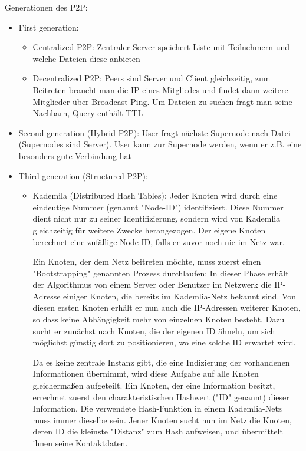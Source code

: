 \documentclass{article}
\begin{document}
	Generationen des P2P:
	\begin{itemize}
		\item First generation:
		\begin{itemize}
			\item Centralized P2P: Zentraler Server speichert Liste mit Teilnehmern und welche Dateien diese anbieten
			\item Decentralized P2P: Peers sind Server und Client gleichzeitig, zum Beitreten braucht man die IP eines Mitgliedes und findet dann weitere Mitglieder über Broadcast Ping. Um Dateien zu suchen fragt man seine Nachbarn, Query enthält TTL
		\end{itemize}
		\item Second generation (Hybrid P2P): User fragt nächste Supernode nach Datei (Supernodes sind Server). User kann zur Supernode werden, wenn er z.B. eine besonders gute Verbindung hat
		\item Third generation (Structured P2P):
		\begin{itemize}
			\item Kademila (Distributed Hash Tables): Jeder Knoten wird durch eine eindeutige Nummer (genannt "Node-ID") identifiziert. Diese Nummer dient nicht nur zu seiner Identifizierung, sondern wird von Kademlia gleichzeitig für weitere Zwecke herangezogen. Der eigene Knoten berechnet eine zufällige Node-ID, falls er zuvor noch nie im Netz war.
			
			Ein Knoten, der dem Netz beitreten möchte, muss zuerst einen "Bootstrapping" genannten Prozess durchlaufen: In dieser Phase erhält der Algorithmus von einem Server oder Benutzer im Netzwerk die IP-Adresse einiger Knoten, die bereits im Kademlia-Netz bekannt sind. Von diesen ersten Knoten erhält er nun auch die IP-Adressen weiterer Knoten, so dass keine Abhängigkeit mehr von einzelnen Knoten besteht. Dazu sucht er zunächst nach Knoten, die der eigenen ID ähneln, um sich möglichst günstig dort zu positionieren, wo eine solche ID erwartet wird.
			
			Da es keine zentrale Instanz gibt, die eine Indizierung der vorhandenen Informationen übernimmt, wird diese Aufgabe auf alle Knoten gleichermaßen aufgeteilt. Ein Knoten, der eine Information besitzt, errechnet zuerst den charakteristischen Hashwert ("ID" genannt) dieser Information. Die verwendete Hash-Funktion in einem Kademlia-Netz muss immer dieselbe sein. Jener Knoten sucht nun im Netz die Knoten, deren ID die kleinste "Distanz" zum Hash aufweisen, und übermittelt ihnen seine Kontaktdaten.
			

\end{itemize}
\end{itemize}
\end{document}
